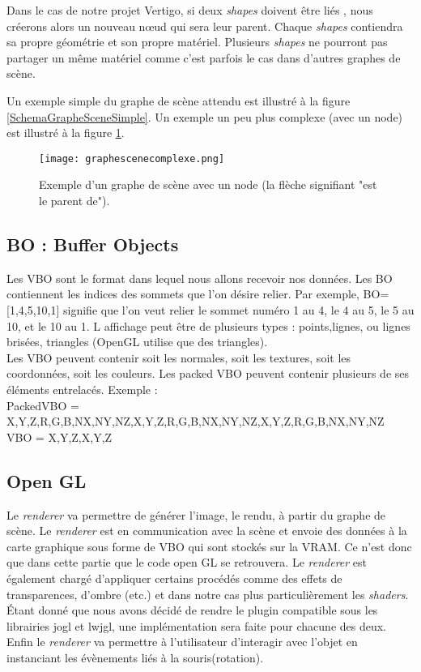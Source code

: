 \documentclass[11pt]{report}
\begin{document}
Dans le cas de notre projet Vertigo, si deux \textit{shapes} doivent être liés , nous créerons alors un nouveau nœud qui sera leur parent. Chaque \textit{shapes} contiendra sa propre géométrie et son propre matériel. Plusieurs \textit{shapes} ne pourront pas partager un même matériel comme c'est parfois le cas dans d'autres graphes de scène.

Un exemple simple du graphe de scène attendu est illustré à la figure \ref{SchemaGrapheSceneSimple}. Un exemple un peu plus complexe (avec un node) est illustré à la figure \ref{graphescenecomplexe}.

\begin{figure}[h!]
  \caption{Exemple d'un graphe de scène avec un node (la flèche signifiant "est le parent de").}
  \centering
\texttt{[image: graphescenecomplexe.png]} 
\label{graphescenecomplexe}
\end{figure}


\subsection{BO : Buffer Objects} 
\label{VBO}%
Les VBO sont le format dans lequel nous allons recevoir nos données. 
Les BO contiennent les indices des sommets que l'on désire relier. Par exemple, BO=[1,4,5,10,1] signifie que l'on veut relier le sommet numéro 1 au 4, le 4 au 5, le 5 au 10, et le 10 au 1. 
 L affichage peut être de plusieurs types : points,lignes, ou lignes  brisées, triangles (OpenGL utilise que des triangles).\\
 
 Les VBO peuvent contenir soit les normales, soit les textures, soit les coordonnées, soit les couleurs.
 Les packed VBO peuvent contenir plusieurs de ses éléments entrelacés.
 Exemple : \\
 PackedVBO = X,Y,Z,R,G,B,NX,NY,NZ,X,Y,Z,R,G,B,NX,NY,NZ,X,Y,Z,R,G,B,NX,NY,NZ\\
 VBO = X,Y,Z,X,Y,Z
 


\subsection{Open GL}

Le \textit{renderer} va permettre de générer l'image, le rendu, à partir du graphe de scène. Le \textit{renderer} est en communication avec la scène et envoie des données à la carte graphique sous forme de VBO qui sont stockés sur la VRAM. Ce n'est donc que dans cette partie que le code open GL se retrouvera.
Le \textit{renderer} est également chargé d'appliquer certains procédés comme des effets de transparences, d'ombre (etc.) et dans notre cas plus particulièrement les \textit{shaders}.
Étant donné que nous avons décidé de rendre le plugin compatible sous les librairies jogl et lwjgl, une implémentation sera faite pour chacune des deux.
Enfin le \textit{renderer} va permettre à l'utilisateur d'interagir avec l'objet en instanciant les évènements liés à la souris(rotation).
\end{document}
